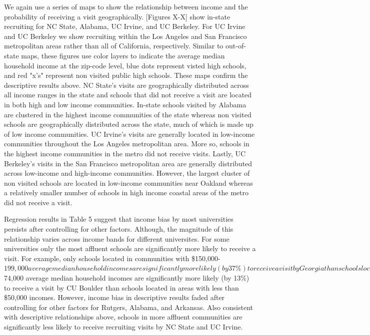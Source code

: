 \documentclass[twoside]{article}
\begin{document}
We again use a series of maps to show the relationship between income and the probability of receiving a visit geographically. [Figures X-X] show in-state recruiting for NC State, Alabama, UC Irvine, and UC Berkeley. For UC Irvine and UC Berkeley we show recruiting within the Los Angeles and San Francisco metropolitan areas rather than all of California, respectively. Similar to out-of-state maps, these figures use color layers to indicate the average median household income at the zip-code level, blue dots represent visted high schools, and red "x's" represent non visited public high schools. These maps confirm the descriptive results above. NC State's visits are geographically distributed across all income ranges in the state and schools that did not receive a visit are located in both high and low income communities. In-state schools visited by Alabama are clustered in the highest income communities of the state whereas non visited schools are geographically distributed across the state, much of which is made up of low income communities. UC Irvine's visits are generally located in low-income communities throughout the Los Angeles metropolitan area. More so, schools in the highest income communities in the metro did not receive visits. Lastly, UC Berkeley's visits in the San Francisco metropolitan area are generally distributed across low-income and high-income communities. However, the largest cluster of non visited schools are located in low-income communities near Oakland whereas a relatively smaller number of schools in high income coastal areas of the metro did not receive a visit.

Regression results in Table 5 suggest that income bias by most universities persists after controlling for other factors. Although, the magnitude of this relationship varies across income bands for different universites. For some universities only the most affluent schools are significantly more likely to receive a visit. For example, only schools located in communities with \$150,000-$199,000 average median household incomes are significantly more likely (by 37\%) to receive a visit by Georgia than schools located in areas with less than \$50,000 incomes. Whereas schools located in relatively lower income communities are significantly more likely to receive a visit for other universities. For example, only schools located in communities with \$50,000-$74,000 average median household incomes are significantly more likely (by 13\%) to receive a visit by CU Boulder than schools located in areas with less than \$50,000 incomes. However, income bias in descriptive results faded after controlling for other factors for Rutgers, Alabama, and Arkansas. Also consistent with descriptive relationships above, schools in more affluent communities are significantly less likely to receive recruiting visits by NC State and UC Irvine. 
\end{document}
